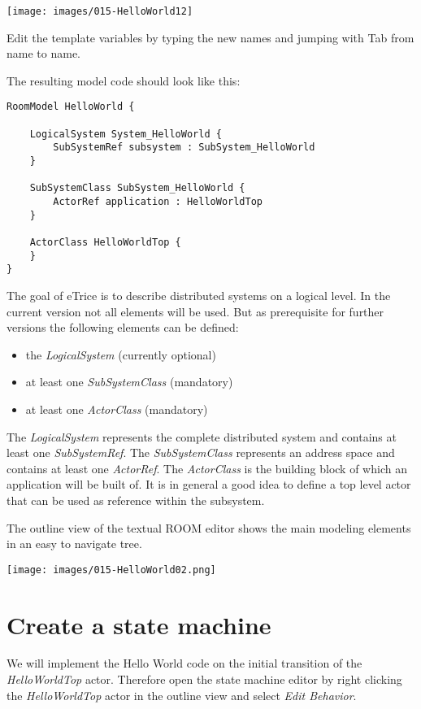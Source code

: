 \texttt{[image: images/015-HelloWorld12]}

Edit the template variables by typing the new names and jumping with Tab from name to name.

The resulting model code should look like this:

\begin{verbatim}
RoomModel HelloWorld {

    LogicalSystem System_HelloWorld {
        SubSystemRef subsystem : SubSystem_HelloWorld
    }

    SubSystemClass SubSystem_HelloWorld {
        ActorRef application : HelloWorldTop
    }

    ActorClass HelloWorldTop {
    }
} 
\end{verbatim}

The goal of eTrice is to describe distributed systems on a logical level. In the current version not all elements will be used. But as prerequisite for further versions the following elements can be defined:
\begin{itemize}
\item the \textit{LogicalSystem} (currently optional)
\item at least one \textit{SubSystemClass} (mandatory)
\item at least one \textit{ActorClass} (mandatory)
\end{itemize}

The \textit{LogicalSystem} represents the complete distributed system and contains at least one \textit{SubSystemRef}. The \textit{SubSystemClass} represents an address space and contains at least one \textit{ActorRef}. The \textit{ActorClass} is the building block of which an application will be built of. It is in general a good idea to define a top level actor that can be used as reference within the subsystem.

The outline view of the textual ROOM editor shows the main modeling elements in an easy to navigate tree.

\texttt{[image: images/015-HelloWorld02.png]}


\section{Create a state machine}

We will implement the Hello World code on the initial transition of the \textit{HelloWorldTop} actor. Therefore open the state machine editor by right clicking the \textit{HelloWorldTop} actor in the outline view and select \textit{Edit Behavior}.

